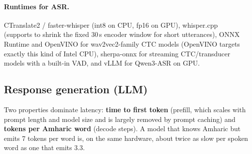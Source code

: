 \paragraph{Runtimes for ASR.} CTranslate2 / faster-whisper (int8 on CPU, fp16 on GPU),
whisper.cpp (supports  to shrink the fixed 30\,s encoder window for short
utterances), ONNX Runtime and OpenVINO for wav2vec2-family CTC models (OpenVINO targets exactly this
kind of Intel CPU), sherpa-onnx for streaming CTC/transducer models with a built-in VAD, and vLLM for
Qwen3-ASR on GPU.

\subsection{Response generation (LLM)}
Two properties dominate latency: \textbf{time to first token} (prefill, which scales with prompt length and
model size and is largely removed by prompt caching) and \textbf{tokens per Amharic word} (decode
steps). A model that knows Amharic but emits 7 tokens per word is, on the same hardware, about twice as
slow per spoken word as one that emits 3.3.

